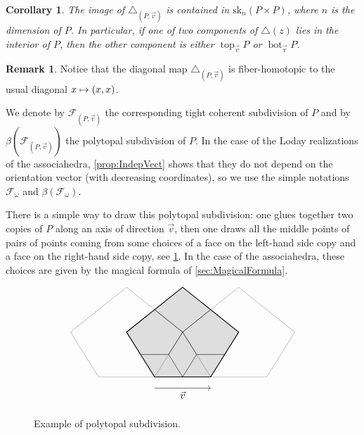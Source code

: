 \documentclass[11pt]{article}
\numberwithin{equation}{section}\providecommand{\No}{}
\let\mathcal\mathscr
\def\mto{\mathchoice{\longmapsto}{\mapsto}{\mapsto}{\mapsto}}
\theoremstyle{plain}
\newtheorem{corollary}{Corollary}
\theoremstyle{definition}
\newtheorem{remark}{Remark}
\newcommand{\sF}{\mathcal{F}}
\DeclareMathOperator{\tp}{top}
\DeclareMathOperator{\bm}{bot}
\newcommand{\sk}{\mathrm{sk}}
\begin{document}
\begin{corollary}\label{cor:DIMENSION}
The image of $\triangle_{(P,\vec v)}$ is contained in $\sk_n (P\times P)$, where $n$ is the dimension of $P$. In particular, if one of two components of $\triangle (z)$ lies in the interior of $P$, then the other component is either $\tp_{\vec v} P$ or $\bm_{\vec v} P$.
\end{corollary}

\begin{remark}
Notice that the diagonal map $\triangle_{(P,\vec v)}$ is fiber-homotopic to the usual diagonal $x\mto (x, x)$.
\end{remark}

We denote by $\sF_{(P, \vec v)}$ the corresponding tight coherent subdivision of $P$ and by $\beta(\sF_{(P, \vec v)})$ the polytopal subdivision of $P$.
In the case of the Loday realizations of the associahedra, \cref{prop:IndepVect} shows that they do not depend on the orientation vector (with decreasing coordinates), so we use the simple notations $\sF_{\omega}$ and $\beta(\sF_\omega)$.

There is a simple way to draw this polytopal subdivision: one glues together two copies of $P$ along an axis of direction $\vec v$, then one draws all the middle points of pairs of points coming from some choices of a face on the left-hand side copy and a face on the right-hand side copy, see \cref{Fig:PolySubBary}. In the case of the associahedra, these choices are given by the magical formula of \cref{sec:MagicalFormula}.
\begin{figure}[htb]
\[
\begin{tikzpicture}[xscale=0.5, yscale=0.4]
\draw[thick] (-4,0)--(0,4)--(4,0)--(2,-4)--(-2,-4)--cycle;
\draw[fill, opacity=0.12] (-4,0)--(0,4)--(4,0)--(2,-4)--(-2,-4)--cycle;
\draw (-2,2)--(0,0)--(-1,-2)--(-3,-2);
\draw (2,2)--(0,0)--(1,-2)--(3,-2);
\draw (-1,-2)--(0,-4)--(1,-2);

\draw[thick,opacity=0.2] (-8,0)--(-4,4)--(0,0)--(-2,-4)--(-6,-4)--cycle;
\draw[thick,opacity=0.2] (8,0)--(4,4)--(0,0)--(2,-4)--(6,-4)--cycle;

\draw[->] (-2,-5)--(2,-5);
\draw (0,-5) node[below] {$\vec v$};
\end{tikzpicture}
\]
\vspace*{-2\baselineskip}
\caption{Example of polytopal subdivision.}\label{Fig:PolySubBary}
\vspace*{-\baselineskip}
\end{figure}
\end{document}
